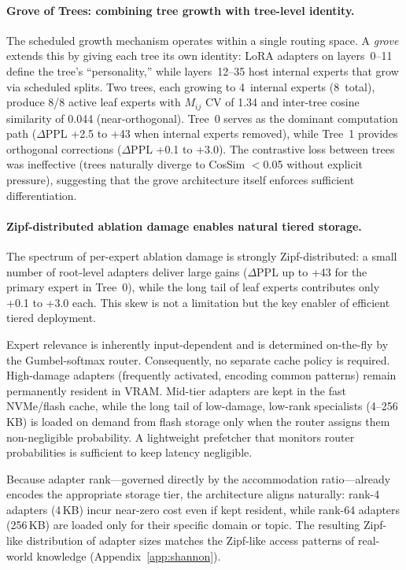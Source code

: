 \documentclass{article}
\begin{document}
\paragraph{Grove of Trees: combining tree growth with tree-level identity.}
The scheduled growth mechanism operates within a single routing space. A
\emph{grove} extends this by giving each tree its own identity: LoRA
adapters on layers~0--11 define the tree's ``personality,'' while
layers~12--35 host internal experts that grow via scheduled splits. Two
trees, each growing to 4~internal experts (8~total), produce 8/8 active
leaf experts with $M_{ij}$ CV of 1.34 and inter-tree cosine similarity of
0.044 (near-orthogonal). Tree~0 serves as the dominant computation path
($\Delta$PPL +2.5 to +43 when internal experts removed), while Tree~1
provides orthogonal corrections ($\Delta$PPL +0.1 to +3.0). The
contrastive loss between trees was ineffective (trees naturally diverge
to CosSim $<$0.05 without explicit pressure), suggesting that the
grove architecture itself enforces sufficient differentiation.

\paragraph{Zipf-distributed ablation damage enables natural tiered storage.}
The spectrum of per-expert ablation damage is strongly Zipf-distributed: a
small number of root-level adapters deliver large gains ($\Delta$PPL up to
+43 for the primary expert in Tree~0), while the long tail of leaf experts
contributes only +0.1 to +3.0 each. This skew is not a limitation but the
key enabler of efficient tiered deployment.

Expert relevance is inherently input-dependent and is determined on-the-fly
by the Gumbel-softmax router. Consequently, no separate cache policy is
required. High-damage adapters (frequently activated, encoding common
patterns) remain permanently resident in VRAM. Mid-tier adapters are kept in
the fast NVMe/flash cache, while the long tail of low-damage, low-rank
specialists (4--256\,KB) is loaded on demand from flash storage only when
the router assigns them non-negligible probability. A lightweight prefetcher
that monitors router probabilities is sufficient to keep latency negligible.

Because adapter rank---governed directly by the accommodation
ratio---already encodes the appropriate storage tier, the architecture
aligns naturally: rank-4 adapters (4\,KB) incur near-zero cost even if
kept resident, while rank-64 adapters (256\,KB) are loaded only for their
specific domain or topic. The resulting Zipf-like distribution of adapter
sizes matches the Zipf-like access patterns of real-world knowledge
(Appendix~\ref{app:shannon}).
\end{document}
